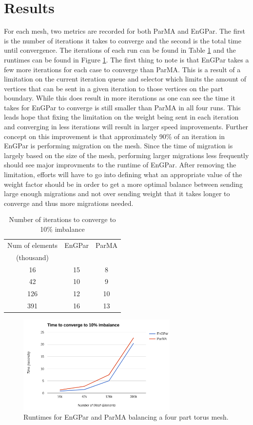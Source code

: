 \documentclass[a4paper]{article}
\begin{document}
\section{Results}
For each mesh, two metrics are recorded for both ParMA and EnGPar. The first is the number of iterations it takes to converge and the second is the total time until convergence. The iterations of each run can be found in Table \ref{tbl:iterations} and the runtimes can be found in Figure \ref{fig:runtime}. The first thing to note is that EnGPar takes a few more iterations for each case to converge than ParMA. This is a result of a limitation on the current iteration queue and selector which limits the amount of vertices that can be sent in a given iteration to those vertices on the part boundary. While this does result in more iterations as one can see the time it takes for EnGPar to converge is still smaller than ParMA in all four runs. This leads hope that fixing the limitation on the weight being sent in each iteration and converging in less iterations will result in larger speed improvements. Further concept on this improvement is that approximately 90\% of an iteration in EnGPar is performing migration on the mesh. Since the time of migration is largely based on the size of the mesh, performing larger migrations less frequently should see major improvments to the runtime of EnGPar. After removing the limitation, efforts will have to go into defining what an appropriate value of the weight factor should be in order to get a more optimal balance between sending large enough migrations and not over sending weight that it takes longer to converge and thus more migrations needed.

\begin{table}
  \centering
  \begin{tabular}{|c|c|c|}
    \hline
    Num of elements & EnGPar & ParMA \\
    (thousand) & & \\
    \hline
    16 & 15 & 8 \\
    42 & 10 & 9 \\
    126 & 12 & 10 \\
    391 & 16 & 13 \\
    \hline
  \end{tabular}
  \caption{Number of iterations to converge to 10\% imbalance}
  \label{tbl:iterations}
\end{table}

\begin{figure}[!ht]
  \centering
  \includegraphics[width=300px]{timeTorus.png}
  \caption{Runtimes for EnGPar and ParMA balancing a four part torus mesh.}
  \label{fig:runtime}
\end{figure}
\end{document}
